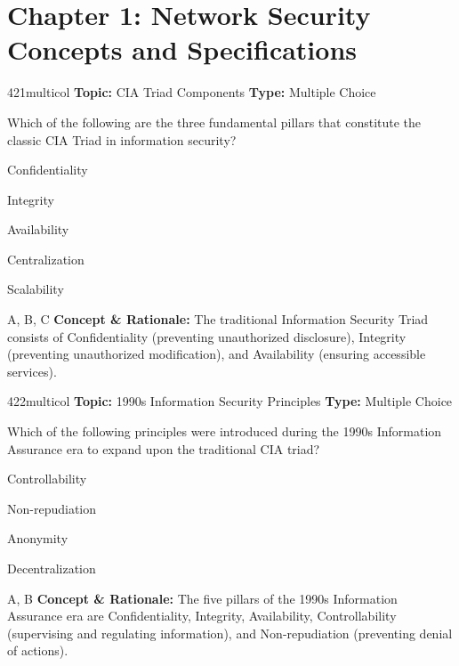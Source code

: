 \section{Chapter 1: Network Security Concepts and Specifications}

\begin{qcard}{421}{multicol}
\textcolor{darkslate!75}{\small\textbf{Topic:} CIA Triad Components \hfill \textbf{Type:} Multiple Choice}\vspace{0.4em}\par
Which of the following are the three fundamental pillars that constitute the classic CIA Triad in information security?
\begin{qoptions}
\item Confidentiality
\item Integrity
\item Availability
\item Centralization
\item Scalability
\end{qoptions}
\end{qcard}
\nopagebreak
\begin{explainbox}{A, B, C}
\textbf{Concept \& Rationale:} The traditional Information Security Triad consists of Confidentiality (preventing unauthorized disclosure), Integrity (preventing unauthorized modification), and Availability (ensuring accessible services).
\end{explainbox}

\begin{qcard}{422}{multicol}
\textcolor{darkslate!75}{\small\textbf{Topic:} 1990s Information Security Principles \hfill \textbf{Type:} Multiple Choice}\vspace{0.4em}\par
Which of the following principles were introduced during the 1990s Information Assurance era to expand upon the traditional CIA triad?
\begin{qoptions}
\item Controllability
\item Non-repudiation
\item Anonymity
\item Decentralization
\end{qoptions}
\end{qcard}
\nopagebreak
\begin{explainbox}{A, B}
\textbf{Concept \& Rationale:} The five pillars of the 1990s Information Assurance era are Confidentiality, Integrity, Availability, Controllability (supervising and regulating information), and Non-repudiation (preventing denial of actions).
\end{explainbox}

